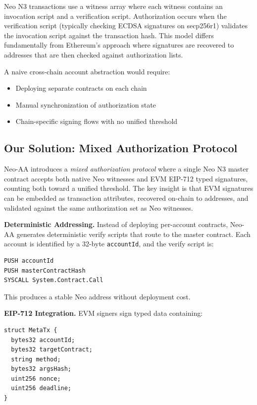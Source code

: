 \documentclass[10pt,twocolumn]{article}
\newcommand{\code}[1]{\texttt{\small #1}}
\begin{document}
Neo N3 transactions use a witness array where each witness contains an invocation script and a verification script. Authorization occurs when the verification script (typically checking ECDSA signatures on secp256r1) validates the invocation script against the transaction hash. This model differs fundamentally from Ethereum's approach where signatures are recovered to addresses that are then checked against authorization lists.

A naive cross-chain account abstraction would require:
\begin{itemize}[leftmargin=*,topsep=2pt,itemsep=1pt]
\item Deploying separate contracts on each chain
\item Manual synchronization of authorization state
\item Chain-specific signing flows with no unified threshold
\end{itemize}

\subsection{Our Solution: Mixed Authorization Protocol}

Neo-AA introduces a \textit{mixed authorization protocol} where a single Neo N3 master contract accepts both native Neo witnesses and EVM EIP-712 typed signatures, counting both toward a unified threshold. The key insight is that EVM signatures can be embedded as transaction attributes, recovered on-chain to addresses, and validated against the same authorization set as Neo witnesses.

\textbf{Deterministic Addressing.} Instead of deploying per-account contracts, Neo-AA generates deterministic verify scripts that route to the master contract. Each account is identified by a 32-byte \code{accountId}, and the verify script is:

\begin{verbatim}
PUSH accountId
PUSH masterContractHash
SYSCALL System.Contract.Call
\end{verbatim}

This produces a stable Neo address without deployment cost.

\textbf{EIP-712 Integration.} EVM signers sign typed data containing:
\begin{verbatim}
struct MetaTx {
  bytes32 accountId;
  bytes32 targetContract;
  string method;
  bytes32 argsHash;
  uint256 nonce;
  uint256 deadline;
}
\end{verbatim}
\end{document}
